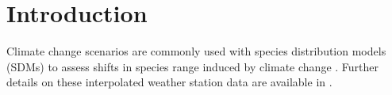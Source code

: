 \documentclass[10pt,letterpaper]{article}
\begin{document}
\section*{Introduction}

Climate change scenarios are commonly used with species distribution
models (SDMs) to assess shifts in species range induced by climate change
\citep{Thuiller2010, Thuiller2011, Lawler2013}. Further details on these interpolated weather
station data are available in \cite{Thuiller2004a}.




\end{document}
